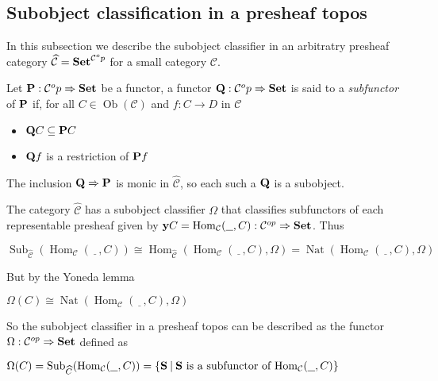 \documentclass[a4paper]{article}
\theoremstyle{defin}
\theoremstyle{theorem}
\theoremstyle{claim}
\theoremstyle{prop}
\theoremstyle{lemma}
\theoremstyle{fact}
\theoremstyle{ex}
\theoremstyle{col}
\begin{document}
\subsection{Subobject classification in a presheaf topos}

In this subsection we describe the subobject classifier in an arbitratry presheaf category $\widehat{\mathcal{C}} = {\bf Set}^{\mathcal{C}^op}$ for a small category $\mathcal{C}$.

Let ${\bf P} : \mathcal{C}^op \Rightarrow {\bf Set}$ be a functor, a functor ${\bf Q} : \mathcal{C}^op \Rightarrow {\bf Set}$ is said to a \emph{subfunctor} of ${\bf P}$ if, for all $C \in \operatorname{Ob}(\mathcal{C})$ and $f : C \to D$ in $\mathcal{C}$
\begin{itemize}
\item ${\bf Q} C \subseteq {\bf P} C$
\item ${\bf Q} f$ is a restriction of ${\bf P} f$
\end{itemize}

The inclusion ${\bf Q} \Rightarrow {\bf P}$ is monic in $\widehat{\mathcal{C}}$, so each such a ${\bf Q}$ is a subobject.

The category $\widehat{\mathcal{C}}$ has a subobject classifier $\Omega$ that classifies subfunctors of each representable presheaf given by ${\bf y}C = \operatorname{Hom}_{\mathcal{C}}(\underline{\:\:\:}, C) : \mathcal{C}^{op} \Rightarrow {\bf Set}$. Thus
\begin{center}
$\operatorname{Sub}_{\widehat{\mathcal{C}}}(\operatorname{Hom}_{\mathcal{C}}(\underline{\:\:\:}, C)) \cong \operatorname{Hom}_{\widehat{\mathcal{C}}}(\operatorname{Hom}_{\mathcal{C}}(\underline{\:\:\:}, C), \Omega) = \operatorname{Nat}(\operatorname{Hom}_{\mathcal{C}}(\underline{\:\:\:}, C), \Omega)$
\end{center}

But by the Yoneda lemma
\begin{center}
$\Omega(C) \cong \operatorname{Nat}(\operatorname{Hom}_{\mathcal{C}}(\underline{\:\:\:}, C), \Omega)$
\end{center}

So the subobject classifier in a presheaf topos can be described as the functor $\Omega : \mathcal{C}^{op} \Rightarrow {\bf Set}$ defined as
\begin{center}
$\Omega(C) = \operatorname{Sub}_{\widehat{C}}(\operatorname{Hom}_{\mathcal{C}}(\underline{\:\:\:}, C)) = \{ {\bf S} \: | \: \text{${\bf S}$ is a subfunctor of $\operatorname{Hom}_{\mathcal{C}}(\underline{\:\:\:}, C)$}\}$
\end{center}
\end{document}
